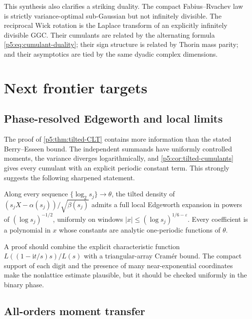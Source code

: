 \documentclass[11pt]{article}
\numberwithin{equation}{section}
\theoremstyle{definition}
\theoremstyle{remark}
\newcommand{\ii}{\mathrm i}
\begin{document}
This synthesis also clarifies a striking duality.  The compact Fabius--Rvachev
law is strictly variance-optimal sub-Gaussian but not infinitely divisible.
The reciprocal Wick rotation is the Laplace transform of an explicitly
infinitely divisible GGC.  Their cumulants are related by the alternating
formula \cref{p5:eq:cumulant-duality}; their sign structure is related by Thorin
mass parity; and their asymptotics are tied by the same dyadic complex
dimensions.

\section{Next frontier targets}

\subsection{Phase-resolved Edgeworth and local limits}

The proof of \cref{p5:thm:tilted-CLT} contains more information than the stated
Berry--Esseen bound.  The independent summands have uniformly controlled
moments, the variance diverges logarithmically, and
\cref{p5:cor:tilted-cumulants} gives every cumulant with an explicit periodic
constant term.  This strongly suggests the following sharpened statement.

\begin{conjecture}
\label{p5:conj:Edgeworth}
Along every sequence $\{\log_2s_j\}\to\theta$, the tilted density of
$(s_jX-\alpha(s_j))/\sqrt{\beta(s_j)}$ admits a full local Edgeworth expansion
in powers of $(\log s_j)^{-1/2}$, uniformly on windows
$|x|\le(\log s_j)^{1/6-\varepsilon}$.  Every coefficient is a polynomial in
$x$ whose constants are analytic one-periodic functions of $\theta$.
\end{conjecture}

A proof should combine the explicit characteristic function
$L((1-\ii t/s)s)/L(s)$ with a triangular-array Cram\'er bound.  The compact
support of each digit and the presence of many near-exponential coordinates
make the nonlattice estimate plausible, but it should be checked uniformly in
the binary phase.

\subsection{All-orders moment transfer}
\end{document}
